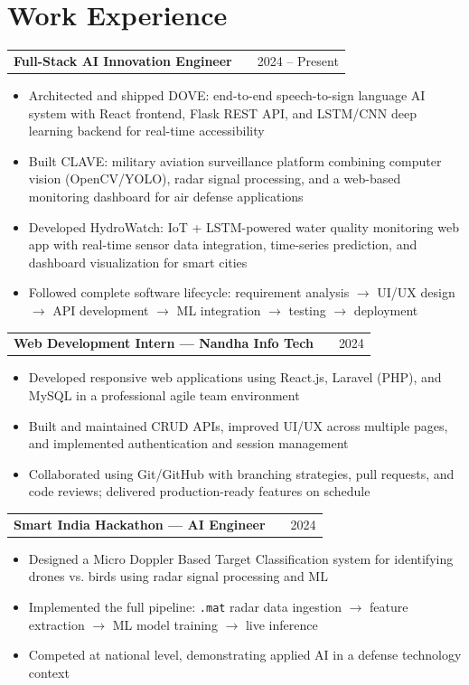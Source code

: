 \documentclass[a4paper,12pt]{article}
\makeatletter
\newenvironment{joblong}[2]
    {
    \begin{tabularx}{\linewidth}{@{}l X r@{}}
    \textbf{#1} & \hfill & #2 \\[2pt]
    \end{tabularx}
    \begin{minipage}[t]{\linewidth}
    \begin{itemize}[nosep,after=\strut, leftmargin=1em, itemsep=2pt,label=--]
    }
    {
    \end{itemize}
    \end{minipage}
    }
\makeatother
\begin{document}
\section{Work Experience}

\begin{joblong}{Full-Stack AI Innovation Engineer}{2024 -- Present}
\item Architected and shipped DOVE: end-to-end speech-to-sign language AI system with React frontend, Flask REST API, and LSTM/CNN deep learning backend for real-time accessibility
\item Built CLAVE: military aviation surveillance platform combining computer vision (OpenCV/YOLO), radar signal processing, and a web-based monitoring dashboard for air defense applications
\item Developed HydroWatch: IoT + LSTM-powered water quality monitoring web app with real-time sensor data integration, time-series prediction, and dashboard visualization for smart cities
\item Followed complete software lifecycle: requirement analysis $\rightarrow$ UI/UX design $\rightarrow$ API development $\rightarrow$ ML integration $\rightarrow$ testing $\rightarrow$ deployment
\end{joblong}

\begin{joblong}{Web Development Intern --- Nandha Info Tech}{2024}
\item Developed responsive web applications using React.js, Laravel (PHP), and MySQL in a professional agile team environment
\item Built and maintained CRUD APIs, improved UI/UX across multiple pages, and implemented authentication and session management
\item Collaborated using Git/GitHub with branching strategies, pull requests, and code reviews; delivered production-ready features on schedule
\end{joblong}

\begin{joblong}{Smart India Hackathon --- AI Engineer}{2024}
\item Designed a Micro Doppler Based Target Classification system for identifying drones vs. birds using radar signal processing and ML
\item Implemented the full pipeline: \texttt{.mat} radar data ingestion $\rightarrow$ feature extraction $\rightarrow$ ML model training $\rightarrow$ live inference
\item Competed at national level, demonstrating applied AI in a defense technology context
\end{joblong}
\end{document}
